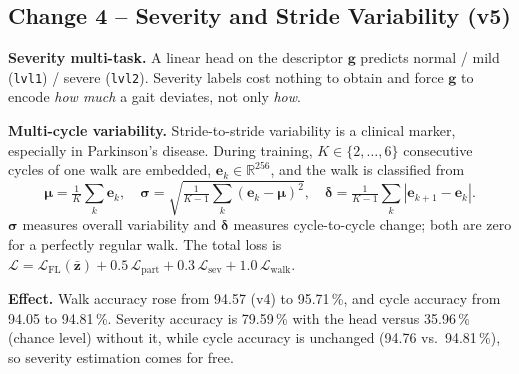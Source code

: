 \documentclass[conference]{IEEEtran}
\newcommand{\R}{\mathbb{R}}
\begin{document}
\subsection{Change 4 -- Severity and Stride Variability (v5)}
\textbf{Severity multi-task.} A linear head on the descriptor $\mathbf{g}$
predicts normal / mild (\texttt{lvl1}) / severe (\texttt{lvl2}). Severity labels
cost nothing to obtain and force $\mathbf{g}$ to encode \emph{how much} a gait
deviates, not only \emph{how}.

\textbf{Multi-cycle variability.} Stride-to-stride variability is a clinical
marker, especially in Parkinson's disease. During training, $K\in\{2,\dots,6\}$
consecutive cycles of one walk are embedded, $\mathbf{e}_k\in\R^{256}$, and the
walk is classified from
\begin{equation}
\boldsymbol\mu=\tfrac1K\textstyle\sum_k\mathbf{e}_k,\quad
\boldsymbol\sigma=\sqrt{\tfrac1{K-1}\sum_k(\mathbf{e}_k-\boldsymbol\mu)^2},\quad
\boldsymbol\delta=\tfrac1{K-1}\sum_k|\mathbf{e}_{k+1}-\mathbf{e}_k| .
\end{equation}
$\boldsymbol\sigma$ measures overall variability and $\boldsymbol\delta$
measures cycle-to-cycle change; both are zero for a perfectly regular walk.
The total loss is
$\mathcal{L}=\mathcal{L}_{\text{FL}}(\bar{\mathbf z})+0.5\,\mathcal{L}_{\text{part}}
+0.3\,\mathcal{L}_{\text{sev}}+1.0\,\mathcal{L}_{\text{walk}}$.

\textbf{Effect.} Walk accuracy rose from 94.57 (v4) to 95.71\,\%, and cycle
accuracy from 94.05 to 94.81\,\%. Severity accuracy is 79.59\,\% with the head
versus 35.96\,\% (chance level) without it, while cycle accuracy is unchanged
(94.76 vs.\ 94.81\,\%), so severity estimation comes for free.
\end{document}
